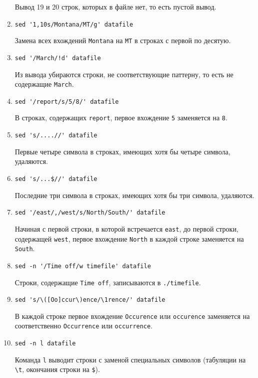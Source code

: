 \documentclass[listings]{labreport}
\begin{document}
\begin{enumerate}
Вывод 19 и 20 строк, которых в файле нет, то есть пустой вывод.

\item \verb|sed '1,10s/Montana/MT/g' datafile|

Замена всех вхождений \verb|Montana| на \verb|MT| в строках с первой по десятую.

\item \verb|sed '/March/!d' datafile|

Из вывода убираются строки, не соответствующие паттерну, то есть не содержащие \verb|March|.

\item \verb|sed '/report/s/5/8/' datafile|

В строках, содержащих \verb|report|, первое вхождение \verb|5| заменяется на \verb|8|.

\item \verb|sed 's/....//' datafile|

Первые четыре символа в строках, имеющих хотя бы четыре символа, удаляются.

\item \verb|sed 's/...$//' datafile|

Последние три символа в строках, имеющих хотя бы три символа, удаляются.

\item \verb|sed '/east/,/west/s/North/South/' datafile|

Начиная с первой строки, в которой встречается \verb|east|, до первой строки, содержащей
\verb|west|, первое вхождение \verb|North| в каждой строке заменяется на \verb|South|.

\item \verb|sed -n '/Time off/w timefile' datafile|

Строки, содержащие \verb|Time off|, записываются в \verb|./timefile|.

\item \verb|sed 's/\([Oo]ccur\)ence/\1rence/' datafile|

В каждой строке первое вхождение \verb|Occurence| или \verb|occurence| заменяется
на соответственно \verb|Occurrence| или \verb|occurrence|.

\item \verb|sed -n l datafile|

Команда \verb|l| выводит строки с заменой специальных символов (табуляции на \verb|\t|,
окончания строки на \verb|$|).

\end{enumerate}
\end{document}
